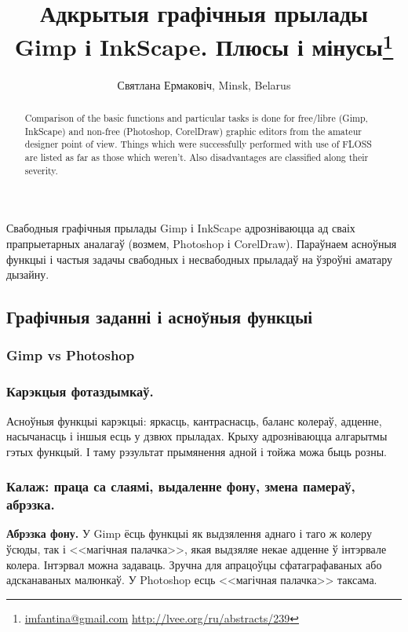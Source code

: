 \documentclass[10pt, a5paper]{article}
\begin{document}
\title{Адкрытыя графічныя прылады Gimp і InkScape. Плюсы і мінусы\footnote{\url{imfantina@gmail.com} \url{http://lvee.org/ru/abstracts/239}}}
\author{Святлана Ермаковіч, Minsk, Belarus}
\maketitle
\begin{abstract}
Comparison of the basic functions and particular tasks is done for free/libre (Gimp, InkScape) and non-free (Photoshop, CorelDraw) graphic editors from the amateur designer point of view. Things which were successfully performed with use of FLOSS are listed as far as those which weren't. Also disadvantages are classified along their severity. 
\end{abstract}
Свабодныя графічныя прылады Gimp і InkScape адрозніваюцца ад сваіх прапрыетарных аналагаў (возмем, Photoshop і CorelDraw). Параўнаем асноўныя функцыі і частыя задачы свабодных і несвабодных прыладаў на ўзроўні аматару дызайну.

\subsection*{Графічныя заданні і асноўныя функцыі}

\subsubsection*{\textbf{Gimp vs Photoshop}}

\subsubsection*{Карэкцыя фотаздымкаў.}

Асноўныя функцыі карэкцыі: яркасць, кантраснасць, баланс колераў, адценне, насычанасць і іншыя есць у дзвюх прыладах.
Крыху адрозніваюцца алгарытмы гэтых функцый. І таму рэзультат прымянення адной і тойжа можа быць розны.

\subsubsection*{Калаж: праца са слаямі, выдаленне фону, змена памераў, абрэзка.}

\textbf{Абрэзка фону.} У Gimp ёсць функцыі як выдзялення аднаго і таго ж колеру ўсюды, так і <<магічная палачка>>, якая выдзяляе некае адценне ў інтэрвале колера. Інтэрвал можна задаваць. Зручна для апрацоўцы сфатаграфаваных або адсканаваных малюнкаў.
У Photoshop есць <<магічная палачка>> таксама.
\end{document}

